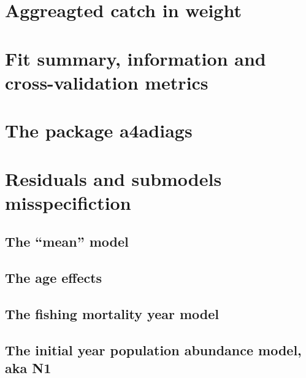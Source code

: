 \documentclass[
]{book}
\begin{document}
\hypertarget{aggreagted-catch-in-weight}{%
\section{Aggreagted catch in weight}\label{aggreagted-catch-in-weight}}

\hypertarget{fit-summary-information-and-cross-validation-metrics}{%
\section{Fit summary, information and cross-validation metrics}\label{fit-summary-information-and-cross-validation-metrics}}

\hypertarget{the-package-a4adiags}{%
\section{The package a4adiags}\label{the-package-a4adiags}}

\hypertarget{residuals-and-submodels-misspecifiction}{%
\section{Residuals and submodels misspecifiction}\label{residuals-and-submodels-misspecifiction}}

\hypertarget{the-mean-model}{%
\subsection{The ``mean'' model}\label{the-mean-model}}

\hypertarget{the-age-effects}{%
\subsection{The age effects}\label{the-age-effects}}

\hypertarget{the-fishing-mortality-year-model}{%
\subsection{The fishing mortality year model}\label{the-fishing-mortality-year-model}}

\hypertarget{the-initial-year-population-abundance-model-aka-n1}{%
\subsection{The initial year population abundance model, aka N1}\label{the-initial-year-population-abundance-model-aka-n1}}
\end{document}
